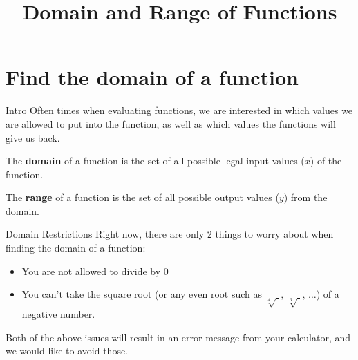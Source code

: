 \documentclass[t]{beamer}
\title{Domain and Range of Functions}
\author{}
\date{}
\begin{document}
\begin{frame}
    \maketitle
\end{frame}

\section{Find the domain of a function}

\begin{frame}{Intro}
Often times when evaluating functions, we are interested in which values we are allowed to put into the function, as well as which values the functions will give us back.	\newline\\	\pause

\begin{tcolorbox}[colback= red!25!white, colframe=red!30!blue, title=Domain]
The \textbf{domain} of a function is the set of all possible legal input values ($x$) of the function.
\end{tcolorbox}	\vspace{8pt} \pause

\begin{tcolorbox}[colback= red!25!white, colframe=red!30!blue, title=Range]
The \textbf{range} of a function is the set of all possible output values ($y$) from the domain.
\end{tcolorbox}
\end{frame}

\begin{frame}{Domain Restrictions}
Right now, there are only 2 things to worry about when finding the domain of a function:	\newline\\	\pause
\begin{itemize}
	\item You are not allowed to divide by 0	\newline\\	\pause
	\item You can't take the square root (or any even root such as $\sqrt[4]{\;}, \, \sqrt[6]{\;}, \, \dots$) of a negative number.	\newline\\	\pause
\end{itemize}

Both of the above issues will result in an error message from your calculator, and we would like to avoid those. 
\end{frame}
\end{document}
